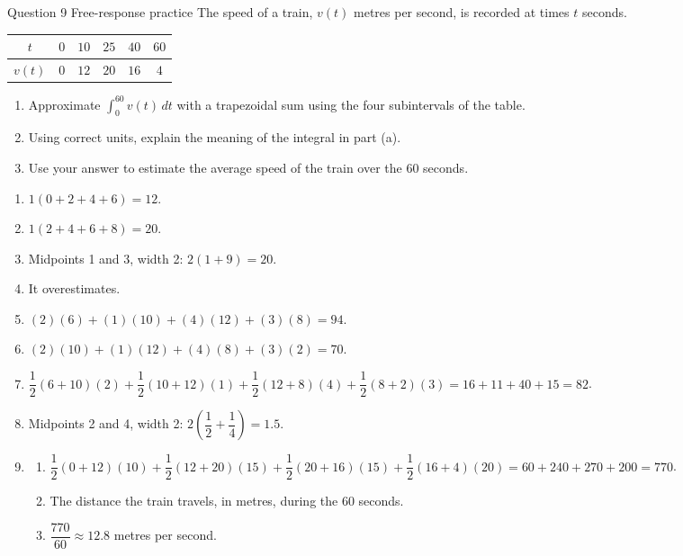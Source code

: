 \documentclass[11pt]{article}
\begin{document}
\begin{frbox}{Question 9 \textperiodcentered{} Free-response practice}
The speed of a train, $v(t)$ metres per second, is recorded at times $t$ seconds.\begin{center}\renewcommand{\arraystretch}{1.25}\begin{tabular}{|c|c|c|c|c|c|}\hline $t$ & $0$ & $10$ & $25$ & $40$ & $60$ \\ \hline $v(t)$ & $0$ & $12$ & $20$ & $16$ & $4$ \\ \hline\end{tabular}\end{center}
\begin{enumerate}[label=(\alph*),leftmargin=*,itemsep=2pt]
  \item Approximate $\displaystyle\int_{0}^{60}v(t)\,dt$ with a trapezoidal sum using the four subintervals of the table.\work{2.6cm}
  \item Using correct units, explain the meaning of the integral in part (a).\work{2.6cm}
  \item Use your answer to estimate the average speed of the train over the 60 seconds.\work{2.6cm}
\end{enumerate}
\end{frbox}

\newpage
\begin{solbox}
\begin{enumerate}[leftmargin=*,itemsep=4pt]
  \item $1(0+2+4+6)=12$.
  \item $1(2+4+6+8)=20$.
  \item Midpoints 1 and 3, width 2: $2(1+9)=20$.
  \item It overestimates.
  \item $(2)(6)+(1)(10)+(4)(12)+(3)(8)=94$.
  \item $(2)(10)+(1)(12)+(4)(8)+(3)(2)=70$.
  \item $\dfrac12(6+10)(2)+\dfrac12(10+12)(1)+\dfrac12(12+8)(4)+\dfrac12(8+2)(3)=16+11+40+15=82$.
  \item Midpoints 2 and 4, width 2: $2\left(\dfrac12+\dfrac14\right)=1.5$.
  \item \begin{enumerate}[label=(\alph*),leftmargin=*,itemsep=3pt]
    \item $\dfrac12(0+12)(10)+\dfrac12(12+20)(15)+\dfrac12(20+16)(15)+\dfrac12(16+4)(20)=60+240+270+200=770$.
    \item The distance the train travels, in metres, during the 60 seconds.
    \item $\dfrac{770}{60}\approx12.8$ metres per second.
  \end{enumerate}
\end{enumerate}
\end{solbox}
\end{document}
